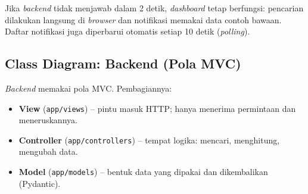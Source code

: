 \documentclass[11pt,a4paper]{article}
\newcommand{\kode}[1]{\texttt{#1}}
\begin{document}
\begin{catatan}
Jika \textit{backend} tidak menjawab dalam 2 detik, \textit{dashboard} tetap berfungsi:
pencarian dilakukan langsung di \textit{browser} dan notifikasi memakai data contoh bawaan.
Daftar notifikasi juga diperbarui otomatis setiap 10 detik (\textit{polling}).
\end{catatan}

\subsection{Class Diagram: Backend (Pola MVC)}
\textit{Backend} memakai pola MVC. Pembagiannya:
\begin{itemize}
  \item \textbf{View} (\kode{app/views}) -- pintu masuk HTTP; hanya menerima permintaan dan meneruskannya.
  \item \textbf{Controller} (\kode{app/controllers}) -- tempat logika: mencari, menghitung, mengubah data.
  \item \textbf{Model} (\kode{app/models}) -- bentuk data yang dipakai dan dikembalikan (Pydantic).
\end{itemize}
\end{document}
